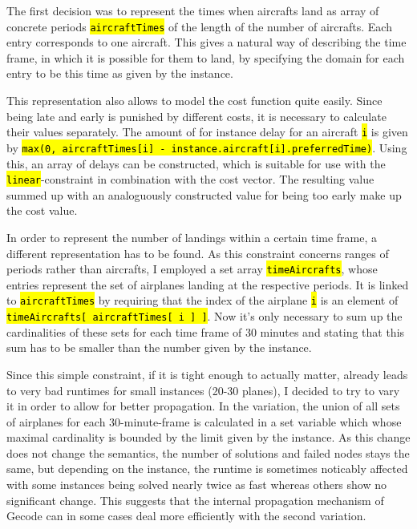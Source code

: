 \documentclass[,%
			paper=a4,%
			DIV12,
			liststotoc,
			bibtotoc,
			draft=false,%
			numbers=noendperiod
			]{scrartcl}
\newcommand{\ilc}[1]{\hl{\texttt{#1}}}
\begin{document}
\marginnote{\Ctime}
The first decision was to represent the times when aircrafts land as array of concrete periods \ilc{aircraftTimes} of the length of the number of aircrafts. Each entry corresponds to one aircraft.
This gives a natural way of describing the time frame, in which it is possible for them to land, by specifying the domain for each entry to be this time as given by the instance.

\marginnote{\Ccost}
This representation also allows to model the cost function quite easily.
Since being late and early is punished by different costs, it is necessary to calculate their values separately.
The amount of for instance delay for an aircraft \ilc{i} is given by \ilc{max(0, aircraftTimes[i] - instance.aircraft[i].preferredTime)}.
Using this, an array of delays can be constructed, which is suitable for use with the \ilc{linear}-constraint in combination with the cost vector.
The resulting value summed up with an analoguously constructed value for being too early make up the cost value.

\marginnote{\Clandings}
In order to represent the number of landings within a certain time frame, a different representation has to be found.
As this constraint concerns ranges of periods rather than aircrafts, I employed a set array \ilc{timeAircrafts}, whose entries represent the set of airplanes landing at the respective periods.
It is linked to \ilc{aircraftTimes} by requiring that the index of the airplane \ilc{i} is an element of \ilc{timeAircrafts[ aircraftTimes[ i ] ]}.
Now it's only necessary to sum up the cardinalities of these sets for each time frame of 30 minutes and stating that this sum has to be smaller than the number given by the instance.

Since this simple constraint, if it is tight enough to actually matter, already leads to very bad runtimes for small instances (20-30 planes), I decided to try to vary it in order to allow for better propagation.
In the variation, the union of all sets of airplanes for each 30-minute-frame is calculated in a set variable which whose maximal cardinality is bounded by the limit given by the instance.   
As this change does not change the semantics, the number of solutions and failed nodes stays the same, but depending on the instance, the runtime is sometimes noticably affected with some instances being solved nearly twice as fast whereas others show no significant change.
This suggests that the internal propagation mechanism of Gecode can in some cases deal more efficiently with the second variation.
\end{document}
